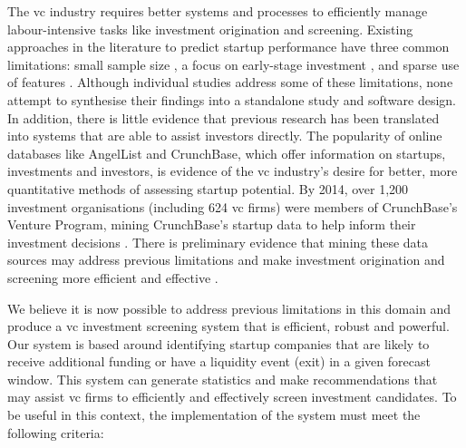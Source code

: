 \documentclass[../thesis/thesis.tex]{subfiles}
\begin{document}
The \gls{vc} industry requires better systems and processes to efficiently manage labour-intensive tasks like investment origination and screening. Existing approaches in the literature to predict startup performance have three common limitations: small sample size \cite{ahlers2015, gimmon2010, dixon2014, hoenen2014, yu2015, an2015, werth2013, croce2016}, a focus on early-stage investment \cite{beckwith2016, ahlers2015, cheng2016, yuan2016, croce2016, stone2014}, and sparse use of features \cite{ahlers2015, an2015, cheng2016, croce2016, werth2013, gimmon2010}. Although individual studies address some of these limitations, none attempt to synthesise their findings into a standalone study and software design. In addition, there is little evidence that previous research has been translated into systems that are able to assist investors directly. The popularity of online databases like AngelList and CrunchBase, which offer information on startups, investments and investors, is evidence of the \gls{vc} industry’s desire for better, more quantitative methods of assessing startup potential. By 2014, over 1,200 investment organisations (including 624 \gls{vc} firms) were members of CrunchBase's Venture Program, mining CrunchBase's startup data to help inform their investment decisions \cite{patil2015}. There is preliminary evidence that mining these data sources may address previous limitations and make investment origination and screening more efficient and effective \cite{stone2014,bhat2011}.

We believe it is now possible to address previous limitations in this domain and produce a \gls{vc} investment screening system that is efficient, robust and powerful. Our system is based around identifying startup companies that are likely to receive additional funding or have a liquidity event (exit) in a given forecast window. This system can generate statistics and make recommendations that may assist \gls{vc} firms to efficiently and effectively screen investment candidates. To be useful in this context, the implementation of the system must meet the following criteria:
\end{document}
